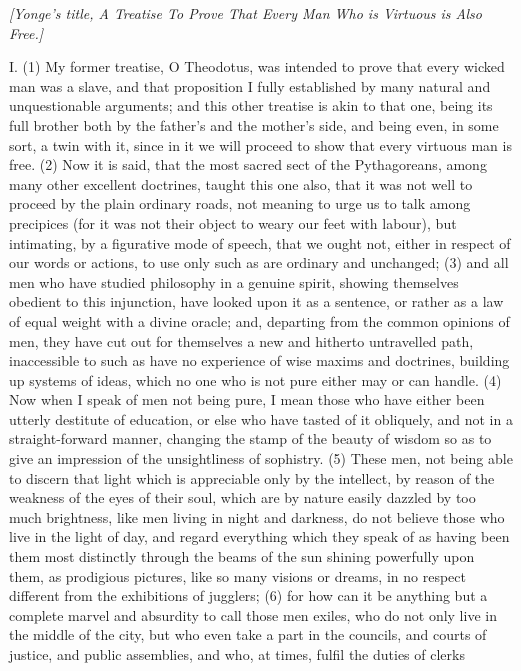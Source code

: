 
\emph{[Yonge's title, A Treatise To Prove That Every Man Who is Virtuous is Also Free.]}

I. (1) My former treatise, O Theodotus, was intended to prove that every wicked man was a slave,
and that proposition I fully established by many natural and unquestionable arguments; and this
other treatise is akin to that one, being its full brother both by the father's and the mother's side,
and being even, in some sort, a twin with it, since in it we will proceed to show that every virtuous
man is free. (2) Now it is said, that the most sacred sect of the Pythagoreans, among many other
excellent doctrines, taught this one also, that it was not well to proceed by the plain ordinary roads,
not meaning to urge us to talk among precipices (for it was not their object to weary our feet with
labour), but intimating, by a figurative mode of speech, that we ought not, either in respect of our
words or actions, to use only such as are ordinary and unchanged; (3) and all men who have
studied philosophy in a genuine spirit, showing themselves obedient to this injunction, have looked
upon it as a sentence, or rather as a law of equal weight with a divine oracle; and, departing from
the common opinions of men, they have cut out for themselves a new and hitherto untravelled path,
inaccessible to such as have no experience of wise maxims and doctrines, building up systems of
ideas, which no one who is not pure either may or can handle. (4) Now when I speak of men not
being pure, I mean those who have either been utterly destitute of education, or else who have
tasted of it obliquely, and not in a straight-forward manner, changing the stamp of the beauty of
wisdom so as to give an impression of the unsightliness of sophistry. (5) These men, not being
able to discern that light which is appreciable only by the intellect, by reason of the weakness of the
eyes of their soul, which are by nature easily dazzled by too much brightness, like men living in
night and darkness, do not believe those who live in the light of day, and regard everything which
they speak of as having been them most distinctly through the beams of the sun shining powerfully
upon them, as prodigious pictures, like so many visions or dreams, in no respect different from the
exhibitions of jugglers; (6) for how can it be anything but a complete marvel and absurdity to call
those men exiles, who do not only live in the middle of the city, but who even take a part in the
councils, and courts of justice, and public assemblies, and who, at times, fulfil the duties of clerks
